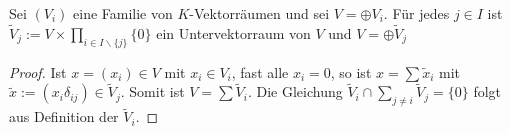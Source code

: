 \begin{lemma}
	Sei $(V_i)$ eine Familie von $K$-Vektorräumen und sei $V=\oplus V_i$. Für jedes $j\in I$ ist $\tilde V_j :=
	V \times \prod_{i\in I\backslash\{j\}} \{0\}$ ein Untervektorraum von $V$ und $V=\oplus \tilde V_j$
\end{lemma}
\begin{proof}
	Ist $x=(x_i)\in V$ mit $x_i\in V_i$, fast alle $x_i=0$, so ist $x=\sum \tilde x_i$ mit $\tilde x:=(x_i\delta_{ij})
	\in \tilde V_j$. Somit ist $V=\sum \tilde V_i$. Die Gleichung $\tilde V_i \cap \sum_{j\neq i} \tilde V_j 
	=\{0\}$ folgt aus Definition der $\tilde V_i.$
\end{proof}